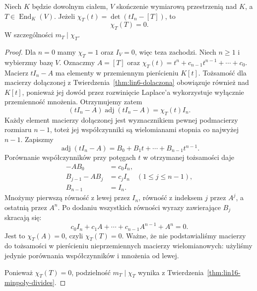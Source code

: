 \begin{twierdzenie}
\label{thm:lin16-cayley-hamilton}
Niech \(K\) będzie dowolnym ciałem,
\(V\) skończenie wymiarową przestrzenią
nad \(K\), a \(T\in\operatorname{End}_K(V)\).
Jeżeli \(\chi_T(t)=\det(tI_n-[T])\),
to
\[
 \chi_T(T)=0.
\]
W szczególności \(m_T\mid\chi_T\).
\end{twierdzenie}
\begin{proof}
Dla \(n=0\) mamy \(\chi_T=1\)
oraz \(I_V=0\), więc teza zachodzi.
Niech \(n\ge1\) i wybierzmy bazę \(V\).
Oznaczmy \(A=[T]\) oraz
\(\chi_T(t)=t^n+c_{n-1}t^{n-1}+\cdots+c_0\).
Macierz \(tI_n-A\) ma elementy w
przemiennym pierścieniu \(K[t]\).
Tożsamość dla macierzy dołączonej
z Twierdzenia~\ref{thm:lin6-dolaczona}
obowiązuje również nad \(K[t]\),
ponieważ jej dowód przez rozwinięcie Laplace'a
wykorzystuje wyłącznie przemienność mnożenia.
Otrzymujemy zatem
\[
 (tI_n-A)\operatorname{adj}(tI_n-A)
 =\chi_T(t)I_n.
\]
Każdy element macierzy dołączonej jest
wyznacznikiem pewnej podmacierzy
rozmiaru \(n-1\), toteż jej współczynniki
są wielomianami stopnia co najwyżej \(n-1\).
Zapiszmy
\[
 \operatorname{adj}(tI_n-A)
 =B_0+B_1t+\cdots+B_{n-1}t^{n-1}.
\]
Porównanie współczynników przy potęgach \(t\)
w otrzymanej tożsamości daje
\[
 \begin{aligned}
 -AB_0&=c_0I_n,\\
 B_{j-1}-AB_j&=c_jI_n
       \quad(1\le j\le n-1),\\
 B_{n-1}&=I_n.
 \end{aligned}
\]
Mnożymy pierwszą równość z lewej przez \(I_n\),
równość z indeksem \(j\) przez \(A^j\),
a ostatnią przez \(A^n\).
Po dodaniu wszystkich równości
wyrazy zawierające \(B_j\) skracają się:
\[
 c_0I_n+c_1A+\cdots+c_{n-1}A^{n-1}+A^n=0.
\]
Jest to \(\chi_T(A)=0\), czyli \(\chi_T(T)=0\).
Ważne, że nie podstawialiśmy macierzy
do tożsamości w pierścieniu
nieprzemiennych macierzy wielomianowych:
użyliśmy jedynie porównania współczynników
i mnożenia od lewej.

Ponieważ \(\chi_T(T)=0\), podzielność
\(m_T\mid\chi_T\) wynika z
Twierdzenia~\ref{thm:lin16-minpoly-divides}.
\end{proof}

